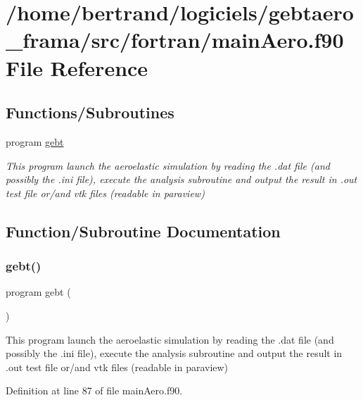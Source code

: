 \hypertarget{main_aero_8f90}{}\section{/home/bertrand/logiciels/gebtaero\+\_\+frama/src/fortran/main\+Aero.f90 File Reference}
\label{main_aero_8f90}
\subsection*{Functions/\+Subroutines}
\begin{DoxyCompactItemize}
\item 
program \hyperlink{main_aero_8f90_a8cc802272376d835be44956439f13f15}{gebt}
\begin{DoxyCompactList}\small\item\em This program launch the aeroelastic simulation by reading the .dat file (and possibly the .ini file), execute the analysis subroutine and output the result in .out test file or/and vtk files (readable in paraview) \end{DoxyCompactList}\end{DoxyCompactItemize}


\subsection{Function/\+Subroutine Documentation}
\mbox{\label{main_aero_8f90_a8cc802272376d835be44956439f13f15}} 
\subsubsection{\texorpdfstring{gebt()}{gebt()}}
{\footnotesize\ttfamily program gebt (\begin{DoxyParamCaption}{ }\end{DoxyParamCaption})}



This program launch the aeroelastic simulation by reading the .dat file (and possibly the .ini file), execute the analysis subroutine and output the result in .out test file or/and vtk files (readable in paraview) 



Definition at line 87 of file main\+Aero.\+f90.

